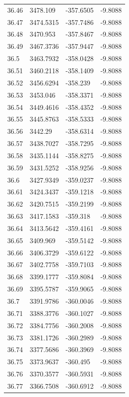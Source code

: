 \begin{table}[H]
\begin{tabular}{llll}
36.46 & 3478.109 & -357.6505 & -9.8088 \\
36.47 & 3474.5315 & -357.7486 & -9.8088 \\
36.48 & 3470.953 & -357.8467 & -9.8088 \\
36.49 & 3467.3736 & -357.9447 & -9.8088 \\
36.5 & 3463.7932 & -358.0428 & -9.8088 \\
36.51 & 3460.2118 & -358.1409 & -9.8088 \\
36.52 & 3456.6294 & -358.239 & -9.8088 \\
36.53 & 3453.046 & -358.3371 & -9.8088 \\
36.54 & 3449.4616 & -358.4352 & -9.8088 \\
36.55 & 3445.8763 & -358.5333 & -9.8088 \\
36.56 & 3442.29 & -358.6314 & -9.8088 \\
36.57 & 3438.7027 & -358.7295 & -9.8088 \\
36.58 & 3435.1144 & -358.8275 & -9.8088 \\
36.59 & 3431.5252 & -358.9256 & -9.8088 \\
36.6 & 3427.9349 & -359.0237 & -9.8088 \\
36.61 & 3424.3437 & -359.1218 & -9.8088 \\
36.62 & 3420.7515 & -359.2199 & -9.8088 \\
36.63 & 3417.1583 & -359.318 & -9.8088 \\
36.64 & 3413.5642 & -359.4161 & -9.8088 \\
36.65 & 3409.969 & -359.5142 & -9.8088 \\
36.66 & 3406.3729 & -359.6122 & -9.8088 \\
36.67 & 3402.7758 & -359.7103 & -9.8088 \\
36.68 & 3399.1777 & -359.8084 & -9.8088 \\
36.69 & 3395.5787 & -359.9065 & -9.8088 \\
36.7 & 3391.9786 & -360.0046 & -9.8088 \\
36.71 & 3388.3776 & -360.1027 & -9.8088 \\
36.72 & 3384.7756 & -360.2008 & -9.8088 \\
36.73 & 3381.1726 & -360.2989 & -9.8088 \\
36.74 & 3377.5686 & -360.3969 & -9.8088 \\
36.75 & 3373.9637 & -360.495 & -9.8088 \\
36.76 & 3370.3577 & -360.5931 & -9.8088 \\
36.77 & 3366.7508 & -360.6912 & -9.8088 \\

\end{tabular}
\end{table}
